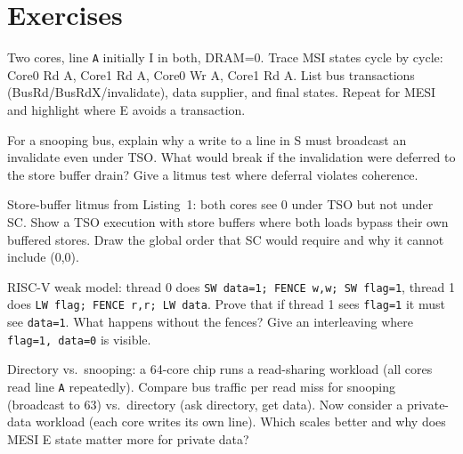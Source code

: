 \section{Exercises}
\begin{exercise}Two cores, line \texttt{A} initially I in both, DRAM=0. Trace MSI states cycle by cycle: Core0 Rd A, Core1 Rd A, Core0 Wr A, Core1 Rd A. List bus transactions (BusRd/BusRdX/invalidate), data supplier, and final states. Repeat for MESI and highlight where E avoids a transaction.\end{exercise}
\begin{exercise}For a snooping bus, explain why a write to a line in S must broadcast an invalidate even under TSO. What would break if the invalidation were deferred to the store buffer drain? Give a litmus test where deferral violates coherence.\end{exercise}
\begin{exercise}Store-buffer litmus from Listing~1: both cores see 0 under TSO but not under SC. Show a TSO execution with store buffers where both loads bypass their own buffered stores. Draw the global order that SC would require and why it cannot include (0,0).\end{exercise}
\begin{exercise}RISC-V weak model: thread 0 does \texttt{SW data=1; FENCE w,w; SW flag=1}, thread 1 does \texttt{LW flag; FENCE r,r; LW data}. Prove that if thread 1 sees \texttt{flag=1} it must see \texttt{data=1}. What happens without the fences? Give an interleaving where \texttt{flag=1, data=0} is visible.\end{exercise}
\begin{exercise}Directory vs.\ snooping: a 64-core chip runs a read-sharing workload (all cores read line \texttt{A} repeatedly). Compare bus traffic per read miss for snooping (broadcast to 63) vs.\ directory (ask directory, get data). Now consider a private-data workload (each core writes its own line). Which scales better and why does MESI E state matter more for private data?\end{exercise}
